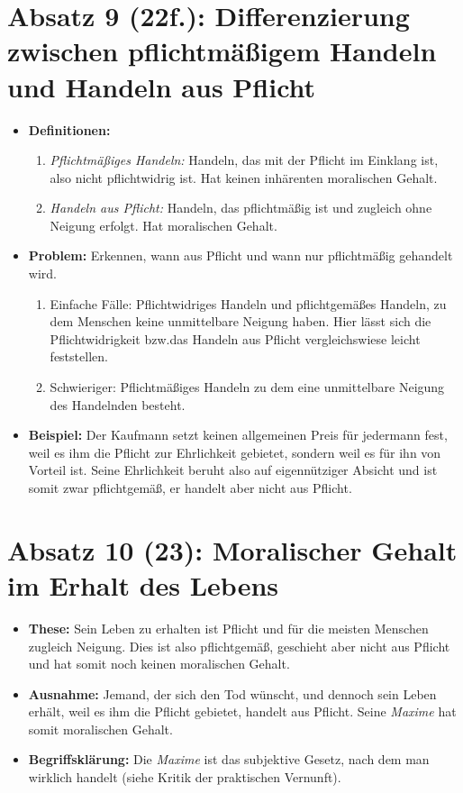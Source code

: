 \documentclass{llncs}
\begin{document}
\section*{Absatz 9 (22f.): Differenzierung zwischen pflichtmäßigem Handeln und Handeln aus Pflicht}

\begin{itemize}
	\item \textbf{Definitionen:}
	 	\begin{enumerate}
	 		\item \textit{Pflichtmäßiges Handeln:} Handeln, das mit der Pflicht im Einklang ist, also nicht pflichtwidrig ist.
				Hat keinen inhärenten moralischen Gehalt.
			\item \textit{Handeln aus Pflicht:} Handeln, das pflichtmäßig ist und zugleich ohne Neigung erfolgt.
				Hat moralischen Gehalt.
	 	\end{enumerate}
	\item \textbf{Problem:} Erkennen, wann aus Pflicht und wann nur pflichtmäßig gehandelt wird.
		\begin{enumerate}
			\item Einfache Fälle: Pflichtwidriges Handeln und pflichtgemäßes Handeln, zu dem Menschen keine unmittelbare Neigung haben.
				Hier lässt sich die Pflichtwidrigkeit bzw.\@ das Handeln aus Pflicht vergleichswiese leicht feststellen.
			\item Schwieriger: Pflichtmäßiges Handeln zu dem eine unmittelbare Neigung des Handelnden besteht.
		\end{enumerate}
	\item \textbf{Beispiel:} Der Kaufmann setzt keinen allgemeinen Preis für jedermann fest, weil es ihm die Pflicht zur Ehrlichkeit gebietet, sondern weil es für ihn von Vorteil ist.
		Seine Ehrlichkeit beruht also auf eigennütziger Absicht und ist somit zwar pflichtgemäß, er handelt aber nicht aus Pflicht.
\end{itemize}

\section*{Absatz 10 (23): Moralischer Gehalt im Erhalt des Lebens}

\begin{itemize}
	\item \textbf{These:} Sein Leben zu erhalten ist Pflicht und für die meisten Menschen zugleich Neigung.
		Dies ist also pflichtgemäß, geschieht aber nicht aus Pflicht und hat somit noch keinen moralischen Gehalt.
	\item \textbf{Ausnahme:} Jemand, der sich den Tod wünscht, und dennoch sein Leben erhält, weil es ihm die Pflicht gebietet, handelt aus Pflicht. Seine \textit{Maxime} hat somit moralischen Gehalt.
	\item \textbf{Begriffsklärung:} Die \textit{Maxime} ist das subjektive Gesetz, nach dem man wirklich handelt (siehe Kritik der praktischen Vernunft).
\end{itemize}
\end{document}
